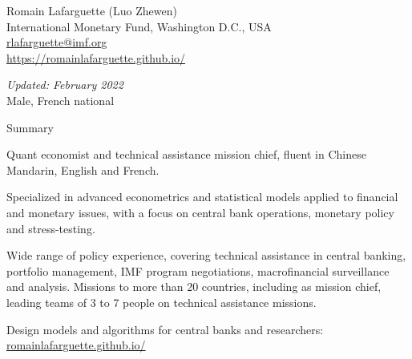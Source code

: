 \documentclass[usegeometry, 10pt, a4paper]{cv} %
\begin{document}
\hspace{10mm}
\begin{chapeau}
\begin{adresse}
\begin{flushleft}
    Romain Lafarguette (Luo Zhewen)\\
    International Monetary Fund, Washington D.C., USA \\
    \href{mailto:rlafarguette@imf.org}{rlafarguette@imf.org}\\
    \url{https://romainlafarguette.github.io/} \\
\end{flushleft}
\end{adresse}
\begin{etatcivil}
\begin{flushleft}
  \emph{Updated: February 2022}\\
Male, French national
\end{flushleft}
\end{etatcivil}
\end{chapeau}

\begin{rubriquetableau}[0.95\textwidth]{Summary}\\
  \vspace{-0.5cm}
    
Quant economist and technical assistance mission chief, fluent in Chinese Mandarin, English and French.\\
\smallskip

Specialized in advanced econometrics and statistical models applied to
financial and monetary issues, with a focus on central bank operations,
monetary policy and stress-testing.\\ 
\smallskip

Wide range of policy experience, covering technical assistance in central
banking, portfolio management, IMF program negotiations, macrofinancial surveillance and
analysis. Missions to more than 20 countries, including as mission chief, leading teams
of 3 to 7 people on technical assistance missions.\\
\smallskip

Design models and algorithms for central banks and researchers: \url{romainlafarguette.github.io/}\\ 

\end{rubriquetableau}
\end{document}

